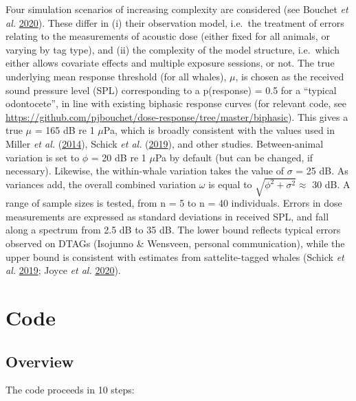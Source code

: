 \documentclass[
]{article}
\begin{document}
Four simulation scenarios of increasing complexity are considered (see Bouchet \emph{et al.} \protect\hyperlink{ref-Bouchet2020a}{2020}). These differ in (i) their observation model, i.e.~the treatment of errors relating to the measurements of acoustic dose (either fixed for all animals, or varying by tag type), and (ii) the complexity of the model structure, i.e.~which either allows covariate effects and multiple exposure sessions, or not. The true underlying mean response threshold (for all whales), \(\mu\), is chosen as the received sound pressure level (SPL) corresponding to a p(response) = 0.5 for a ``typical odontocete'', in line with existing biphasic response curves (for relevant code, see \url{https://github.com/pjbouchet/dose-response/tree/master/biphasic}). This gives a true \(\mu\) = 165 dB re 1 \(\mu\)Pa, which is broadly consistent with the values used in Miller \emph{et al.} (\protect\hyperlink{ref-Miller2014}{2014}), Schick \emph{et al.} (\protect\hyperlink{ref-Schick2019}{2019}), and other studies. Between-animal variation is set to \(\phi\) = 20 dB re 1 \(\mu\)Pa by default (but can be changed, if necessary). Likewise, the within-whale variation takes the value of \(\sigma\) = 25 dB. As variances add, the overall combined variation \(\omega\) is equal to \(\sqrt{{\phi}^2 + {\sigma}^2}\approx\) 30 dB. A range of sample sizes is tested, from n = 5 to n = 40 individuals. Errors in dose measurements are expressed as standard deviations in received SPL, and fall along a spectrum from 2.5 dB to 35 dB. The lower bound reflects typical errors observed on DTAGs (Isojunno \& Wensveen, personal communication), while the upper bound is consistent with estimates from sattelite-tagged whales (Schick \emph{et al.} \protect\hyperlink{ref-Schick2019}{2019}; Joyce \emph{et al.} \protect\hyperlink{ref-Joyce2020}{2020}).

\section{Code}

\subsection{Overview}

The code proceeds in 10 steps:

\end{document}
